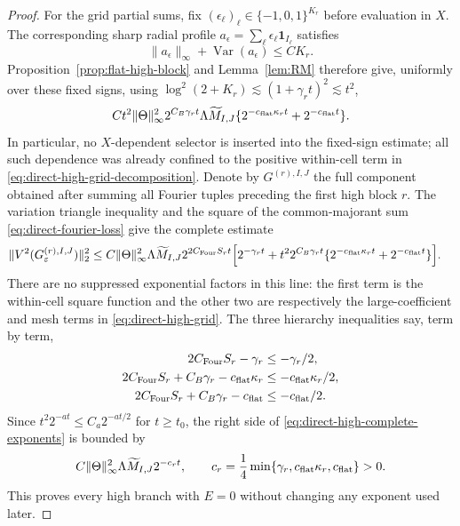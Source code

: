 \documentclass[11pt]{article}
\numberwithin{equation}{section}
\theoremstyle{remark}
\theoremstyle{definition}
\newcommand{\Var}{\operatorname{Var}}
\newcommand{\norm}[1]{\lVert #1\rVert}
\begin{document}
\begin{proof}
For the grid partial sums, fix
$(\epsilon_\ell)_\ell\in\{-1,0,1\}^{K_r}$ before evaluation in $X$.
The corresponding sharp radial profile
$a_\epsilon=\sum_\ell\epsilon_\ell\mathbf1_{I_\ell}$ satisfies
\[
 \norm{a_\epsilon}_\infty+\Var(a_\epsilon)\le CK_r.
\]
Proposition~\ref{prop:flat-high-block} and
Lemma~\ref{lem:RM} therefore give, uniformly over these fixed signs,
using
$\log^2(2+K_r)\lesssim(1+\gamma_rt)^2\lesssim t^2$,
\begin{equation}\label{eq:direct-high-grid}
 Ct^2\norm\Theta_\infty^2
 2^{C_B\gamma_rt}\Lambda\widetilde M_{I,J}
 \{2^{-c_{\rm flat}\kappa_rt}+2^{-c_{\rm flat}t}\}.
\end{equation}
In particular, no $X$-dependent selector is inserted into the fixed-sign
estimate; all such dependence was already confined to the positive
within-cell term in \eqref{eq:direct-high-grid-decomposition}.  Denote by
$G^{(r),I,J}$ the full component obtained after summing all Fourier tuples
preceding the first high block $r$.  The variation triangle inequality and
the square of the common-majorant sum
\eqref{eq:direct-fourier-loss} give the complete estimate
\begin{align}
 \norm{V^2(G^{(r),I,J}_\varepsilon)}_2^2
 &\le C\norm\Theta_\infty^2\Lambda\widetilde M_{I,J}
  2^{2C_{\rm Four}S_rt}\Bigl[
    2^{-\gamma_rt}
   +t^2 2^{C_B\gamma_rt}
    \{2^{-c_{\rm flat}\kappa_rt}+2^{-c_{\rm flat}t}\}
  \Bigr].
 \label{eq:direct-high-complete-exponents}
\end{align}
There are no suppressed exponential factors in this line: the first term
is the within-cell square function and the other two are respectively the
large-coefficient and mesh terms in \eqref{eq:direct-high-grid}.  The
three hierarchy inequalities say, term by term,
\begin{align*}
 2C_{\rm Four}S_r-\gamma_r&\le-\gamma_r/2,\\
 2C_{\rm Four}S_r+C_B\gamma_r-c_{\rm flat}\kappa_r
   &\le-c_{\rm flat}\kappa_r/2,\\
 2C_{\rm Four}S_r+C_B\gamma_r-c_{\rm flat}
   &\le-c_{\rm flat}/2.
\end{align*}
Since $t^2 2^{-at}\le C_a2^{-at/2}$ for $t\ge t_0$, the right side of
\eqref{eq:direct-high-complete-exponents} is bounded by
\[
 C\norm\Theta_\infty^2\Lambda\widetilde M_{I,J}2^{-c_rt},
 \qquad
 c_r=\frac14\min\{\gamma_r,c_{\rm flat}\kappa_r,c_{\rm flat}\}>0.
\]
This proves every high branch with $E=0$ without changing any exponent
used later.


\end{proof}
\end{document}
